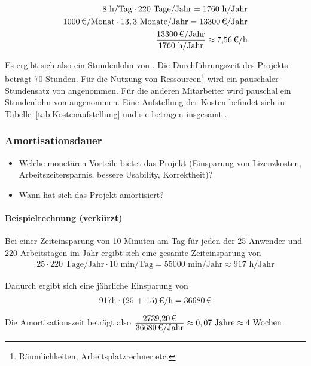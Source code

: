 \begin{eqnarray}
8 \mbox{ h/Tag} \cdot 220 \mbox{ Tage/Jahr} = 1760 \mbox{ h/Jahr}\\
\eur{1000}\mbox{/Monat} \cdot 13,3 \mbox{ Monate/Jahr} = \eur{13300} \mbox{/Jahr}\\
\frac{\eur{13300} \mbox{/Jahr}}{1760 \mbox{ h/Jahr}} \approx \eur{7,56}\mbox{/h}
\end{eqnarray}

Es ergibt sich also ein Stundenlohn von . 
Die Durchführungszeit des Projekts beträgt 70 Stunden. Für die Nutzung von Ressourcen\footnote{Räumlichkeiten, Arbeitsplatzrechner etc.} wird 
ein pauschaler Stundensatz von  angenommen. Für die anderen Mitarbeiter wird pauschal ein Stundenlohn von  angenommen. 
Eine Aufstellung der Kosten befindet sich in Tabelle~\ref{tab:Kostenaufstellung} und sie betragen insgesamt .


\subsubsection{Amortisationsdauer}
\label{sec:Amortisationsdauer}
\begin{itemize}
	\item Welche monetären Vorteile bietet das Projekt (\zB Einsparung von Lizenzkosten, Arbeitszeitersparnis, bessere Usability, Korrektheit)?
	\item Wann hat sich das Projekt amortisiert?
\end{itemize}

\paragraph{Beispielrechnung (verkürzt)}
Bei einer Zeiteinsparung von 10 Minuten am Tag für jeden der 25 Anwender und 220 Arbeitstagen im Jahr ergibt sich eine gesamte Zeiteinsparung von 
\begin{eqnarray}
25 \cdot 220 \mbox{ Tage/Jahr} \cdot 10 \mbox{ min/Tag} = 55000 \mbox{ min/Jahr} \approx 917 \mbox{ h/Jahr} 
\end{eqnarray}

Dadurch ergibt sich eine jährliche Einsparung von 
\begin{eqnarray}
917 \mbox{h} \cdot \eur{(25 + 15)}{\mbox{/h}} = \eur{36680}
\end{eqnarray}

Die Amortisationszeit beträgt also $\frac{\eur{2739,20}}{\eur{36680}\mbox{/Jahr}} \approx 0,07 \mbox{ Jahre} \approx 4 \mbox{ Wochen}$.



